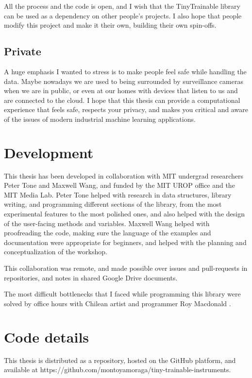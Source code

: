 All the process and the code is open, and I wish that the TinyTrainable library can be used as a dependency on other people's projects. I also hope that people modify this project and make it their own, building their own spin-offs. 

\subsection{Private}

A huge emphasis I wanted to stress is to make people feel safe while handling the data. Maybe nowadays we are used to being surrounded by surveillance cameras when we are in public, or even at our homes with devices that listen to us and are connected to the cloud. I hope that this thesis can provide a computational experience that feels safe, respects your privacy, and makes you critical and aware of the issues of modern industrial machine learning applications.

\section{Development}

This thesis has been developed in collaboration with MIT undergrad researchers Peter Tone and Maxwell Wang, and funded by the MIT UROP office and the MIT Media Lab. Peter Tone helped with research in data structures, library writing, and programming different sections of the library, from the most experimental features to the most polished ones, and also helped with the design of the user-facing methods and variables. Maxwell Wang helped with proofreading the code, making sure the language of the examples and documentation were appropriate for beginners, and helped with the planning and conceptualization of the workshop. 

This collaboration was remote, and made possible over issues and \glspl{pull-request} in repositories, and notes in shared Google Drive documents.

The most difficult bottlenecks that I faced while programming this library were solved by office hours with Chilean artist and programmer Roy Macdonald \cite{website-roy-macdonald}.

\section{Code details}

This thesis is distributed as a repository, hosted on the GitHub platform, and available at https://github.com/montoyamoraga/tiny-trainable-instruments.


